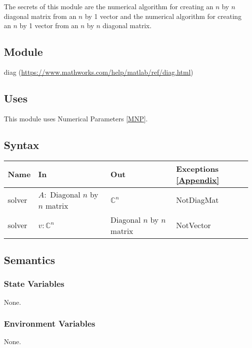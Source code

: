 \documentclass[12pt, titlepage]{article}
\begin{document}
The secrets of this module are the numerical algorithm for creating an $n$ by 
$n$ diagonal 
matrix from an $n$ by 1 vector and the numerical algorithm for creating an $n$ 
by 1 vector from an $n$ by $n$ diagonal 
matrix. 

\subsection{Module}

diag (\url{https://www.mathworks.com/help/matlab/ref/diag.html})

\subsection{Uses}

This module uses Numerical Parameters \ref{MNP}. 

\subsection{Syntax}

\begin{center}
	\begin{tabular}{p{2cm} p{6cm} p{6cm} p{3cm}}
		\hline
		\textbf{Name} & \textbf{In} & \textbf{Out} & \textbf{Exceptions} 
		\ref{Appendix} \\
		\hline
		solver & $A :$ Diagonal $n$ by $n$ matrix  & $\mathbb{C}^{n}$ & 
		NotDiagMat \\ 
		solver & $v :\mathbb{C}^{n}$  & Diagonal $n$ by $n$ matrix & 
		NotVector \\
		\hline
	\end{tabular}
\end{center}

\subsection{Semantics}

\subsubsection{State Variables}

None.

\subsubsection{Environment Variables}

None.
\end{document}
